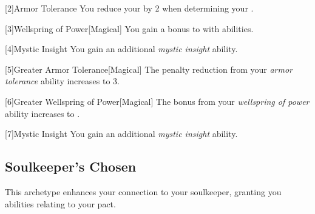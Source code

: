         [2]{Armor Tolerance} You reduce your  by 2 when determining your .

        [3]{Wellspring of Power}[Magical]
        You gain a  bonus to  with  abilities.

        [4]{Mystic Insight} You gain an additional \textit{mystic insight} ability.

        [5]{Greater Armor Tolerance}[Magical] The penalty reduction from your \textit{armor tolerance} ability increases to 3.

        [6]{Greater Wellspring of Power}[Magical]
        The bonus from your \textit{wellspring of power} ability increases to .

        [7]{Mystic Insight} You gain an additional \textit{mystic insight} ability.

    \subsection{Soulkeeper's Chosen}
        This archetype enhances your connection to your soulkeeper, granting you abilities relating to your pact.

